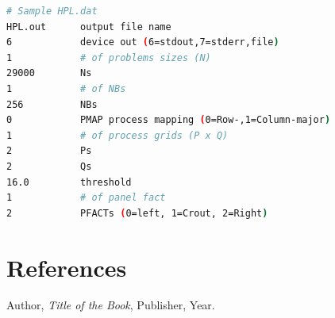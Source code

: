 \documentclass[a4paper,12pt]{article}
\begin{document}
\begin{lstlisting}[language=bash, caption=HPL Configuration File]
# Sample HPL.dat
HPL.out      output file name
6            device out (6=stdout,7=stderr,file)
1            # of problems sizes (N)
29000        Ns
1            # of NBs
256          NBs
0            PMAP process mapping (0=Row-,1=Column-major)
1            # of process grids (P x Q)
2            Ps
2            Qs
16.0         threshold
1            # of panel fact
2            PFACTs (0=left, 1=Crout, 2=Right)
\end{lstlisting}

\newpage

\section{References}
\begin{thebibliography}{9}
Author, \textit{Title of the Book}, Publisher, Year.
\end{thebibliography}

\newpage
\end{document}
